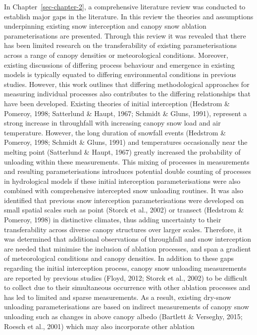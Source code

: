 \documentclass[
  letterpaper,
]{tex/uofsthesis-cs}
\begin{document}
In Chapter~\ref{sec-chapter-2}, a comprehensive literature review was
conducted to establish major gaps in the literature. In this review the
theories and assumptions underpinning existing snow interception and
canopy snow ablation parameterisations are presented. Through this
review it was revealed that there has been limited research on the
transferability of existing parameterisations across a range of canopy
densities or meteorological conditions. Moreover, existing discussions
of differing process behaviour and emergence in existing models is
typically equated to differing environmental conditions in previous
studies. However, this work outlines that differing methodological
approaches for measuring individual processes also contributes to the
differing relationships that have been developed. Existing theories of
initial interception (Hedstrom \& Pomeroy, 1998; Satterlund \& Haupt,
1967; Schmidt \& Gluns, 1991), represent a strong increase in
throughfall with increasing canopy snow load and air temperature.
However, the long duration of snowfall events (Hedstrom \& Pomeroy,
1998; Schmidt \& Gluns, 1991) and temperatures occasionally near the
melting point (Satterlund \& Haupt, 1967) greatly increased the
probability of unloading within these measurements. This mixing of
processes in measurements and resulting parameterisations introduces
potential double counting of processes in hydrological models if these
initial interception parameterisations were also combined with
comprehensive intercepted snow unloading routines. It was also
identified that previous snow interception parameterisations were
developed on small spatial scales such as point (Storck et al., 2002) or
transect (Hedstrom \& Pomeroy, 1998) in distinctive climates, thus
adding uncertainty to their transferability across diverse canopy
structures over larger scales. Therefore, it was determined that
additional observations of throughfall and snow interception are needed
that minimise the inclusion of ablation processes, and span a gradient
of meteorological conditions and canopy densities. In addition to these
gaps regarding the initial interception process, canopy snow unloading
measurements are reported by previous studies (Floyd, 2012; Storck et
al., 2002) to be difficult to collect due to their simultaneous
occurrence with other ablation processes and has led to limited and
sparse measurements. As a result, existing dry-snow unloading
parameterisations are based on indirect measurements of canopy snow
unloading such as changes in above canopy albedo (Bartlett \& Verseghy,
2015; Roesch et al., 2001) which may also incorporate other ablation
\end{document}
